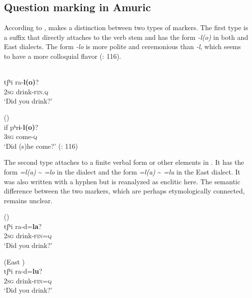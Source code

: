 \subsection{Question marking in Amuric}\label{sec:5.2.2}

According to \citet[45]{Gruzdeva1998},  makes a distinction between two types of  markers. The first type is a suffix that directly attaches to the verb stem and has the form \textit{-l(o)} in both  and East  dialects. The form \textit{-lo} is more polite and ceremonious than \textit{-l}, which seems to have a more colloquial flavor (\citealt{NedjalkovOtaina2013}: 116).

\ea%
    \label{ex:amur:2}
    \\
    \gll tʃʰi     ra-\textbf{{l(o)}}?\\
    2\textsc{sg}    drink-\textsc{fin}.\textsc{q}\\
    \glt ‘Did you drink?’ \citep[45]{Gruzdeva1998}
    \z

\ea%
    \label{ex:amur:3}
     ()\\
    \gll if    pʰrɨ-\textbf{{l(o)}}?\\
    3\textsc{sg}    come-\textsc{q}\\
    \glt ‘Did (s)he come?’ (\citealt{NedjalkovOtaina2013}: 116)
    \z

The second type attaches to a finite verbal form or other elements in . It has the form \textit{=l(a)} {\textasciitilde} \textit{=lo} in the  dialect and the form \textit{=l(a)} {\textasciitilde} \textit{=lu} in the East  dialect. It was also written with a hyphen but is reanalyzed as enclitic here. The semantic difference between the two markers, which are perhaps etymologically connected, remains unclear.

\clearpage %
\ea%
    \label{ex:amur:4}
     ()\\
    \gll tʃʰi     ra-d=\textbf{{la}}?\\
    2\textsc{sg}    drink-\textsc{fin=q}\\
    \glt ‘Did you drink?’
    \z

\ea%
    \label{ex:amur:5}
     (East )\\
    \gll tʃʰi     ra-d=\textbf{{lu}}?\\
    2\textsc{sg}    drink-\textsc{fin=q}\\
    \glt ‘Did you drink?’ \citep[45]{Gruzdeva1998}
    \z

